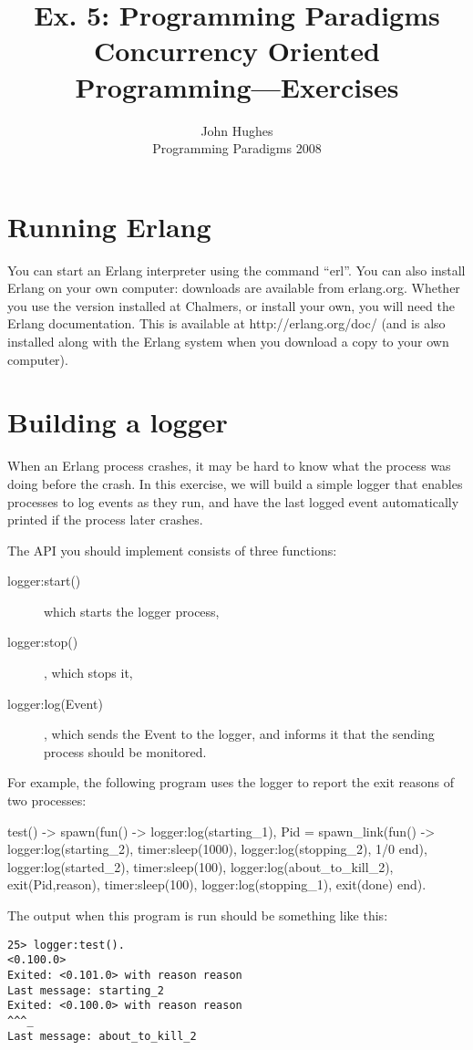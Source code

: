 \documentclass{article}
\newcommand{\courseinfo}{ John Hughes \\ Programming Paradigms 2008 }
\begin{document}
\title{Ex. 5: Programming Paradigms 
\\
Concurrency Oriented Programming—Exercises}
\author{\courseinfo}
\date{}
\maketitle

\section{Running Erlang}

You can start an Erlang interpreter using the command ``erl''. You can also install Erlang on your own computer: downloads are available from erlang.org. Whether you use the version installed at Chalmers, or install your own, you will need the Erlang documentation. This is available at http://erlang.org/doc/ (and is also installed along with the Erlang system when you download a copy to your own computer).


\section{Building a logger}

When an Erlang process crashes, it may be hard to know what the
process was doing before the crash. In this exercise, we will build a
simple logger that enables processes to log events as they run, and
have the last logged event automatically printed if the process later
crashes.

The API you should implement consists of three functions:

\begin{description}
\item[logger:start()] which starts the logger process,
\item[logger:stop()], which stops it,
\item[logger:log(Event)], which sends the Event to the logger, and informs it that the sending process should be monitored.
\end{description}

For example, the following program uses the logger to report the exit reasons of two processes:
\begin{erlang}
test() ->
    spawn(fun() ->
	  logger:log(starting_1),
	  Pid = spawn_link(fun() ->
			   logger:log(starting_2),
			   timer:sleep(1000),
			   logger:log(stopping_2),
			   1/0
		   end),
	  logger:log(started_2),
	  timer:sleep(100),
	  logger:log(about_to_kill_2),
	  exit(Pid,reason),
	  timer:sleep(100),
	  logger:log(stopping_1),
	  exit(done)
	end).
\end{erlang}
The output when this program is run should be something  like this:
\begin{verbatim}
25> logger:test().
<0.100.0>
Exited: <0.101.0> with reason reason
Last message: starting_2
Exited: <0.100.0> with reason reason
^^^_
Last message: about_to_kill_2
\end{verbatim}
\end{document}
